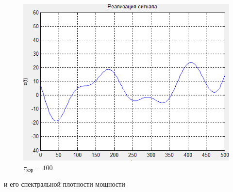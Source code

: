 \begin{figure}[H]
\begin{minipage}{0.3\linewidth}
    \includegraphics[width=\linewidth]{fig/fig1_t100}
	\caption*{$\tau_\text{кор}=100$}
\end{minipage}
  \end{figure}
и его спектральной плотности мощности
